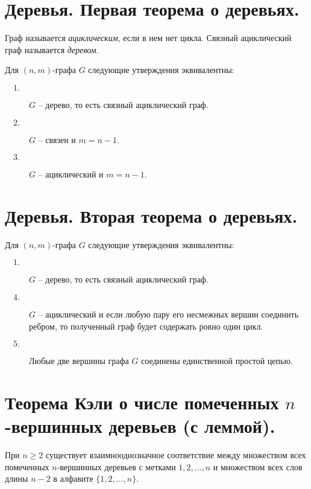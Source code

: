\section{Деревья. Первая теорема о деревьях.}

\begin{definition}
    Граф называется \emph{ациклическим}, если в нем нет цикла. Связный ациклический граф называется \emph{деревом}.
\end{definition}

\begin{theorem}
    Для $ (n,m) $-графа $ G $ следующие утверждения эквивалентны:
    \begin{description}
        \item[$ \quad 1. $] $ G $ -- дерево, то есть связный ациклический граф.
        \item[$ \quad 2. $] $ G $ -- связен и $ m = n - 1 $.
        \item[$ \quad 3. $] $ G $ -- ациклический и $ m=n-1 $.
    \end{description}
\end{theorem}

\section{Деревья. Вторая теорема о деревьях.}

\begin{theorem}
    Для $ (n,m) $-графа $ G $ следующие утверждения эквивалентны:
    \begin{description}
        \item[$ \quad 1. $] $ G $ -- дерево, то есть связный ациклический граф.
        \item[$ \quad 4. $] $ G $ -- ациклический и если любую пару его несмежных вершин соединить ребром, то полученный граф будет содержать ровно один цикл.
        \item[$ \quad 5. $] Любые две вершины графа $ G $ соединены единственной простой цепью.
    \end{description}
\end{theorem}

\section{Теорема Кэли о числе помеченных $n$-вершинных деревьев (с леммой).}

\begin{lemma}\label{lemma:1}
    При $ n \geqslant 2 $ существует взаимнооднозначное соответствие между множеством всех помеченных $ n $-вершинных деревьев с метками $ 1,2,\ldots,n $ и множеством всех слов длины $ n-2 $ в алфавите $ \{1,2,\ldots,n\} $.
\end{lemma}

